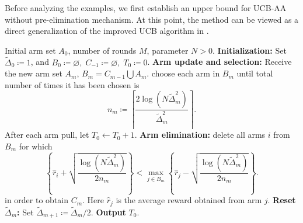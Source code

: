 \documentclass[
  12pt]{article}
\begin{document}
Before analyzing the examples, we first establish an upper bound for UCB-AA without pre-elimination mechanism. At this point, the method can be viewed as a direct generalization of the improved UCB algorithm in \textcite{Auer2010UCBRI}. 


\setcounter{algorithm}{2}
\begin{algorithm}[htbp]
\caption{\textbf{UCB-AA without pre-elimination mechanism}}
\begin{algorithmic}[1]
\Require Initial arm set $A_0$, number of rounds $M$, parameter $N>0$.
\State \textbf{Initialization:} Set $\tilde{\Delta}_0 \coloneqq 1$, and $B_0 \coloneqq \varnothing, \;C_{-1}\coloneqq\varnothing,\; T_0\coloneqq0$.
    \State
    \textbf{Arm update and selection:}
    \State \quad Receive the new arm set $A_m$, $B_m=C_{m-1}\bigcup A_m$.
        \State \quad choose each arm in $B_m$ until total number of times it has been chosen is
        \[
            n_m \coloneqq \left\lceil \frac{2\log(N\tilde{\Delta}_m^2)}{\tilde{\Delta}_m^2} \right\rceil.
        \]
        After each arm pull, let $T_0\leftarrow T_0+1$.
    \State
    \textbf{Arm elimination:}
    \State \quad delete all arms $i$ from $B_m$ for which
    \[
        \left\{ \hat{r}_i + \sqrt{\frac{\log(N\tilde{\Delta}_m^2)}{2n_m}} \right\}
        < \max_{j \in B_m} \left\{ \hat{r}_j - \sqrt{\frac{\log(N\tilde{\Delta}_m^2)}{2n_m}} \right\}.
    \]
    \State \quad in order to obtain $C_{m}$. Here $\hat{r}_j$ is the average reward obtained from arm $j$.
    \State
    \textbf{Reset $\tilde{\Delta}_m$:}
    \State \quad Set $\tilde{\Delta}_{m+1} \coloneqq \tilde{\Delta}_m / 2$.
\EndFor
    \State \textbf{Output} $T_0$.
\end{algorithmic}
\end{algorithm}
\end{document}
